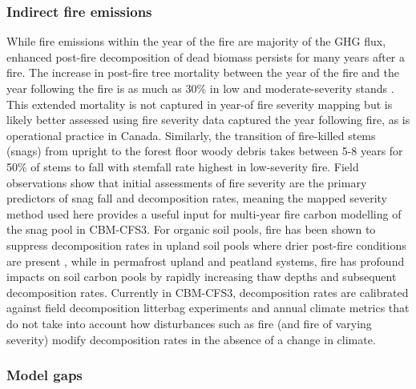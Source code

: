 \documentclass[, manuscript]{copernicus}
\begin{document}
\subsubsection{Indirect fire emissions}

While fire emissions within the year of the fire are majority of the GHG
flux, enhanced post-fire decomposition of dead biomass persists for many
years after a fire. The increase in post-fire tree mortality between the
year of the fire and the year following the fire is as much as 30\% in
low and moderate-severity stands \citep{angers2011}. This extended
mortality is not captured in year-of fire severity mapping but is likely
better assessed using fire severity data captured the year following
fire, as is operational practice in Canada. Similarly, the transition of
fire-killed stems (snags) from upright to the forest floor woody debris
takes between 5-8 years for 50\% of stems to fall \citep{angers2011}
with stemfall rate highest in low-severity fire. Field observations show
that initial assessments of fire severity are the primary predictors of
snag fall \citep{angers2011} and decomposition \citep{boulanger2011}
rates, meaning the mapped severity method used here provides a useful
input for multi-year fire carbon modelling of the snag pool in CBM-CFS3.
For organic soil pools, fire has been shown to suppress decomposition
rates in upland soil pools where drier post-fire conditions are present
\citep{holden2015}, while in permafrost upland \citep{odonnell2011} and
peatland \citep{gibson2018, gibson2019} systems, fire has profound
impacts on soil carbon pools by rapidly increasing thaw depths and
subsequent decomposition rates. Currently in CBM-CFS3, decomposition
rates are calibrated against field decomposition litterbag experiments
\citep{trofymow2002} and annual climate metrics that do not take into
account how disturbances such as fire (and fire of varying severity)
modify decomposition rates in the absence of a change in climate.

\subsubsection{Model gaps}
\end{document}
